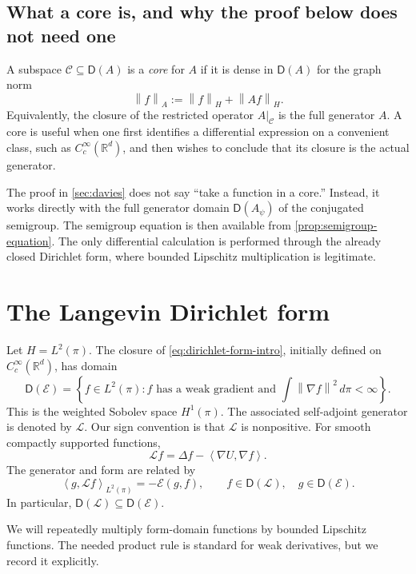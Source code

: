 \documentclass[11pt]{article}
\newcommand{\R}{\mathbb R}
\newcommand{\cE}{\mathcal E}
\newcommand{\ip}[2]{\left\langle #1,#2\right\rangle}
\newcommand{\norm}[1]{\left\lVert #1\right\rVert}
\newcommand{\1}{\mathbf 1}
\newcommand{\D}{\mathsf D}
\begin{document}
\subsection{What a core is, and why the proof below does not need one}

A subspace \(\mathcal C\subseteq\D(A)\) is a \emph{core} for \(A\) if it is
dense in \(\D(A)\) for the graph norm
\[
 \norm f_A:=\norm f_H+\norm{Af}_H.
\]
Equivalently, the closure of the restricted operator
\(A|_{\mathcal C}\) is the full generator \(A\).  A core is useful when one
first identifies a differential expression on a convenient class, such as
\(C_c^\infty(\R^d)\), and then wishes to conclude that its closure is the
actual generator.

The proof in \cref{sec:davies} does not say ``take a function in a core.''
Instead, it works directly with the full generator domain
\(\D(A_\psi)\) of the conjugated semigroup.  The semigroup equation is then
available from \cref{prop:semigroup-equation}.  The only differential
calculation is performed through the already closed Dirichlet form, where
bounded Lipschitz multiplication is legitimate.

\section{The Langevin Dirichlet form}\label{sec:form}

Let \(H=L^2(\pi)\).  The closure of
\eqref{eq:dirichlet-form-intro}, initially defined on
\(C_c^\infty(\R^d)\), has domain
\begin{equation}\label{eq:form-domain}
 \D(\cE)=
 \left\{
 f\in L^2(\pi):
 f\text{ has a weak gradient and }
 \int\norm{\nabla f}^2\,d\pi<\infty
 \right\}.
\end{equation}
This is the weighted Sobolev space \(H^1(\pi)\).  The associated
self-adjoint generator is denoted by \(\mathcal L\).  Our sign convention is
that \(\mathcal L\) is nonpositive.  For smooth compactly supported
functions,
\[
 \mathcal Lf=\Delta f-\ip{\nabla U}{\nabla f}.
\]
The generator and form are related by
\begin{equation}\label{eq:form-generator-relation}
 \ip{g}{\mathcal Lf}_{L^2(\pi)}=-\cE(g,f),
 \qquad f\in\D(\mathcal L),\quad g\in\D(\cE).
\end{equation}
In particular, \(\D(\mathcal L)\subseteq\D(\cE)\).

We will repeatedly multiply form-domain functions by bounded Lipschitz
functions.  The needed product rule is standard for weak derivatives, but
we record it explicitly.
\end{document}
